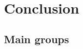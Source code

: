 \documentclass[a4paper]{article}
\begin{document}
%
%
%
%
%
%
%

\section{Conclusion}
\label{sect|conclusion}

\subsection{Main groups}
\end{document}
